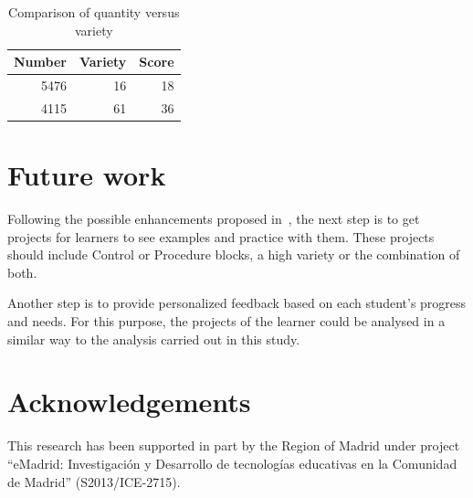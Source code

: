 \documentclass[a4paper]{article}
\begin{document}
\begin{table}
\begin{center}
\caption{Comparison of quantity versus variety}
\bigskip
\label{tab:comp-num-var}
\begin{tabular}{|r|r|r|}
\hline
Number & Variety & Score \\ \hline
5476 & 16 & 18\\ \hline
4115 & 61 & 36\\ \hline
\end{tabular}
\end{center}
\end{table}

\section{Future work}
Following the possible enhancements proposed in~\cite{robles2018ontools}, the next step is to get projects for learners to see examples and practice with them. These projects should include Control or Procedure blocks, a high variety or the combination of both. 

Another step is to provide personalized feedback based on each student's progress and needs. For this purpose, the projects of the learner could be analysed in a similar way to the analysis carried out in this study.

\section*{Acknowledgements}
This research has been supported in part 
by the Region of Madrid under project ``eMadrid:
Investigaci\'on y Desarrollo de tecnolog\'ias educativas en la
Comunidad de Madrid'' (S2013/ICE-2715).


 

\end{document}
